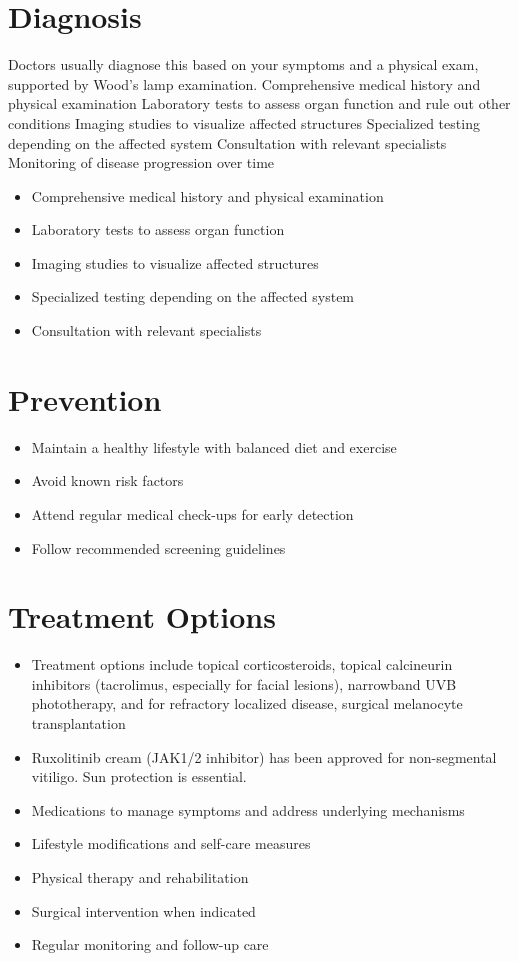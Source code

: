 \section{Diagnosis}
Doctors usually diagnose this based on your symptoms and a physical exam, supported by Wood's lamp examination. Comprehensive medical history and physical examination Laboratory tests to assess organ function and rule out other conditions Imaging studies to visualize affected structures Specialized testing depending on the affected system Consultation with relevant specialists Monitoring of disease progression over time

\begin{itemize}[noitemsep]
  \item Comprehensive medical history and physical examination
  \item Laboratory tests to assess organ function
  \item Imaging studies to visualize affected structures
  \item Specialized testing depending on the affected system
  \item Consultation with relevant specialists
\end{itemize}
\section{Prevention}
\begin{itemize}[noitemsep]
  \item Maintain a healthy lifestyle with balanced diet and exercise
  \item Avoid known risk factors
  \item Attend regular medical check-ups for early detection
  \item Follow recommended screening guidelines
\end{itemize}
\section{Treatment Options}
\begin{itemize}[noitemsep]
  \item Treatment options include topical corticosteroids, topical calcineurin inhibitors (tacrolimus, especially for facial lesions), narrowband UVB phototherapy, and for refractory localized disease, surgical melanocyte transplantation
  \item Ruxolitinib cream (JAK1/2 inhibitor) has been approved for non-segmental vitiligo. Sun protection is essential.
  \item Medications to manage symptoms and address underlying mechanisms
  \item Lifestyle modifications and self-care measures
  \item Physical therapy and rehabilitation
  \item Surgical intervention when indicated
  \item Regular monitoring and follow-up care
\end{itemize}
